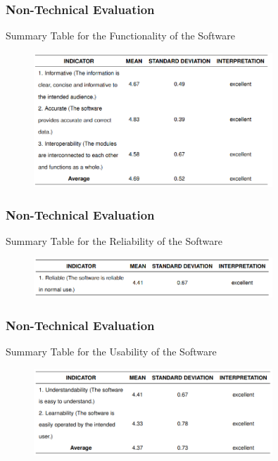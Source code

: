 \documentclass[handout]{beamer}
\begin{document}
\begin{frame}
	\frametitle{Non-Technical Evaluation}
	\begin{block}{Summary Table for the Functionality of the Software}
		\begin{figure}
			\includegraphics[width=0.8\textwidth]{figures/res_non_tech_functionality.png}
		\end{figure}
	\end{block}
\end{frame}

\begin{frame}
	\frametitle{Non-Technical Evaluation}
	\begin{block}{Summary Table for the Reliability of the Software}
		\begin{figure}
			\includegraphics[width=0.8\textwidth]{figures/res_non_tech_reliability.png}
		\end{figure}
	\end{block}
\end{frame}

\begin{frame}
	\frametitle{Non-Technical Evaluation}
	\begin{block}{Summary Table for the Usability of the Software}
		\begin{figure}
			\includegraphics[width=0.8\textwidth]{figures/res_non_tech_usability.png}
		\end{figure}
	\end{block}
\end{frame}
\end{document}
